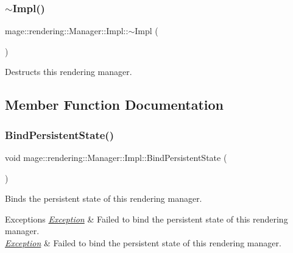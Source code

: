 \subsubsection{\texorpdfstring{$\sim$\+Impl()}{~Impl()}}
{\footnotesize\ttfamily mage\+::rendering\+::\+Manager\+::\+Impl\+::$\sim$\+Impl (\begin{DoxyParamCaption}{ }\end{DoxyParamCaption})}

Destructs this rendering manager. 

\subsection{Member Function Documentation}
\hypertarget{classmage_1_1rendering_1_1_manager_1_1_impl_a0ffe370f901194395d73f641f72313d6}{}\label{classmage_1_1rendering_1_1_manager_1_1_impl_a0ffe370f901194395d73f641f72313d6} 
\subsubsection{\texorpdfstring{Bind\+Persistent\+State()}{BindPersistentState()}}
{\footnotesize\ttfamily void mage\+::rendering\+::\+Manager\+::\+Impl\+::\+Bind\+Persistent\+State (\begin{DoxyParamCaption}{ }\end{DoxyParamCaption})}

Binds the persistent state of this rendering manager.


\begin{DoxyExceptions}{Exceptions}
{\em \hyperlink{classmage_1_1_exception}{Exception}} & Failed to bind the persistent state of this rendering manager. \\
\hline
{\em \hyperlink{classmage_1_1_exception}{Exception}} & Failed to bind the persistent state of this rendering manager. \\
\hline
\end{DoxyExceptions}
\hypertarget{classmage_1_1rendering_1_1_manager_1_1_impl_a413668c5240857bf38197fc8a700ceab}{}\label{classmage_1_1rendering_1_1_manager_1_1_impl_a413668c5240857bf38197fc8a700ceab} 
